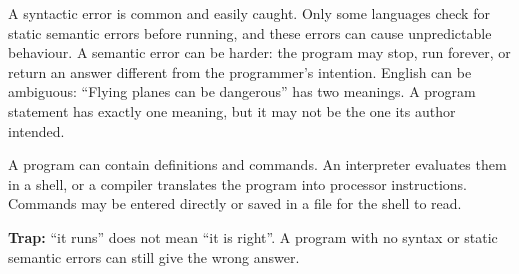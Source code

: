 \documentclass[11pt]{article}
\begin{document}
\begin{keepsection}
\begin{keepsection}
\begin{center}
\begin{minipage}[t]{0.950\linewidth}\centering
{}\par{}\end{minipage}
\end{center}

A syntactic error is common and easily caught. Only some languages check for static semantic errors before running, and these errors can cause unpredictable behaviour. A semantic error can be harder: the program may stop, run forever, or return an answer different from the programmer's intention. English can be ambiguous: “Flying planes can be dangerous” has two meanings. A program statement has exactly one meaning, but it may not be the one its author intended.

A program can contain definitions and commands. An interpreter evaluates them in a shell, or a compiler translates the program into processor instructions. Commands may be entered directly or saved in a file for the shell to read.

\begin{notebox}\textbf{Trap:} “it runs” does not mean “it is right”. A program with no syntax or static semantic errors can still give the wrong answer.\end{notebox}


\end{keepsection}
\end{keepsection}
\end{document}

